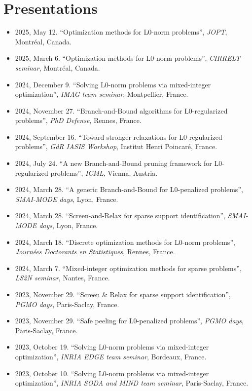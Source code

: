 \section{Presentations}

\begin{itemize}
    \item 2025, May 12. ``Optimization methods for L0-norm problems'', \textit{JOPT}, Montréal, Canada.
    \item 2025, March 6. ``Optimization methods for L0-norm problems'', \textit{CIRRELT seminar}, Montréal, Canada.
    \item 2024, December 9. ``Solving L0-norm problems via mixed-integer optimization'', \textit{IMAG team seminar}, Montpellier, France.
    \item 2024, November 27. ``Branch-and-Bound algorithms for L0-regularized problems'', \textit{PhD Defense}, Rennes, France.
    \item 2024, September 16. ``Toward stronger relaxations for L0-regularized problems'', \textit{GdR IASIS Workshop}, Institut Henri Poincaré, France.
    \item 2024, July 24. ``A new Branch-and-Bound pruning framework for L0-regularized problems'', \textit{ICML}, Vienna, Austria.
    \item 2024, March 28. ``A generic Branch-and-Bound for L0-penalized problems'', \textit{SMAI-MODE days}, Lyon, France.
    \item 2024, March 28. ``Screen-and-Relax for sparse support identification'', \textit{SMAI-MODE days}, Lyon, France.
    \item 2024, March 18. ``Discrete optimization methods for L0-norm problems'', \textit{Journées Doctorants en Statistiques}, Rennes, France.
    \item 2024, March 7. ``Mixed-integer optimization methods for sparse problems'', \textit{LS2N seminar}, Nantes, France.
    \item 2023, November 29. ``Screen \& Relax for sparse support identification'', \textit{PGMO days}, Paris-Saclay, France.
    \item 2023, November 29. ``Safe peeling for L0-penalized problems'', \textit{PGMO days}, Paris-Saclay, France.
    \item 2023, October 19. ``Solving L0-norm problems via mixed-integer optimization'', \textit{INRIA EDGE team seminar}, Bordeaux, France.
    \item 2023, October 10. ``Solving L0-norm problems via mixed-integer optimization'', \textit{INRIA SODA and MIND team seminar}, Paris-Saclay, France.

\end{itemize}
